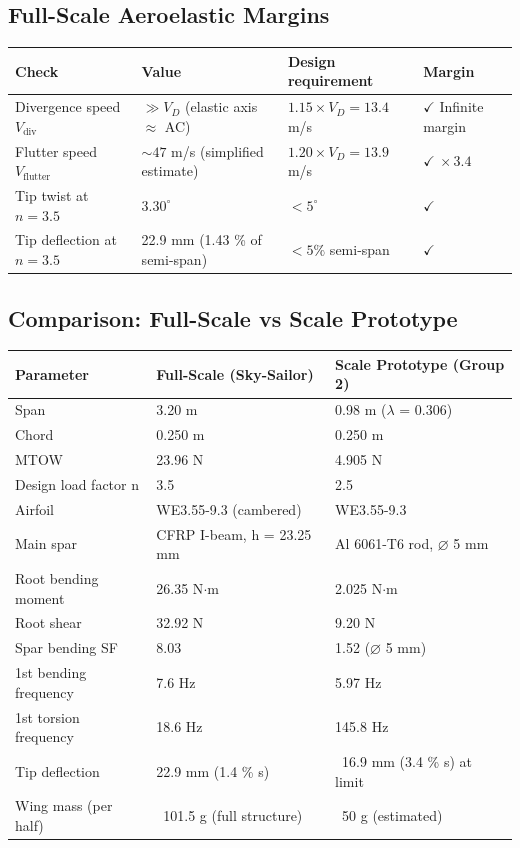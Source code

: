 \documentclass[10pt,a4paper]{article}
\begin{document}
\subsection{Full-Scale Aeroelastic Margins}

\begin{center}
\renewcommand{\arraystretch}{1.2}
\begin{tabularx}{\textwidth}{|p{3cm}|p{3cm}|X|p{2.5cm}|}
\hline
Check & Value & Design requirement & Margin \\
\hline
Divergence speed $V_{\text{div}}$ & $\gg V_D$ (elastic axis $\approx$ AC) & $1.15 \times V_D = 13.4$ m/s & $\checkmark$ Infinite margin \\
\hline
Flutter speed $V_{\text{flutter}}$ & $\sim 47$ m/s (simplified estimate) & $1.20 \times V_D = 13.9$ m/s & $\checkmark\ \times 3.4$ \\
\hline
Tip twist at $n = 3.5$ & $3.30^{\circ}$ & $< 5^{\circ}$ & $\checkmark$ \\
\hline
Tip deflection at $n = 3.5$ & 22.9 mm (1.43 \% of semi-span) & $< 5\%$ semi-span & $\checkmark$ \\
\hline
\end{tabularx}
\end{center}

\subsection{Comparison: Full-Scale vs Scale Prototype}

\begin{center}
\begin{tabular}{|l|l|l|}
\hline
Parameter & Full-Scale (Sky-Sailor) & Scale Prototype (Group 2) \\
\hline
Span & 3.20 m & 0.98 m (${\lambda}$ = 0.306) \\
\hline
Chord & 0.250 m & 0.250 m \\
\hline
MTOW & 23.96 N & 4.905 N \\
\hline
Design load factor n & 3.5 & 2.5 \\
\hline
Airfoil & WE3.55-9.3 (cambered) & WE3.55-9.3 \\
\hline
Main spar & CFRP I-beam, h = 23.25 mm & Al 6061-T6 rod, $\varnothing$ 5 mm \\
\hline
Root bending moment & 26.35 N${\cdot}$m & 2.025 N${\cdot}$m \\
\hline
Root shear & 32.92 N & 9.20 N \\
\hline
Spar bending SF & 8.03 & 1.52 ($\varnothing$ 5 mm) \\
\hline
1st bending frequency & 7.6 Hz & 5.97 Hz \\
\hline
1st torsion frequency & 18.6 Hz & 145.8 Hz \\
\hline
Tip deflection & 22.9 mm (1.4 \% s) & ~16.9 mm (3.4 \% s) at limit \\
\hline
Wing mass (per half) & ~101.5 g (full structure) & ~50 g (estimated) \\
\hline
\end{tabular}
\end{center}
\end{document}
